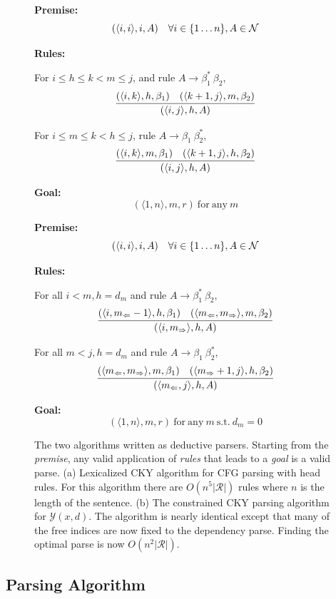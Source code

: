 \documentclass[11pt,letterpaper]{article}
\newcommand{\rules}{\mathcal{R}}
\newcommand{\Left}[1]{#1_{\Leftarrow}}
\newcommand{\Right}[1]{#1_{\Rightarrow}}
\newcommand{\Span}[1]{\langle #1 \rangle}
\newcommand{\tri}{\langle \Left{m}, \Right{m} \rangle}
\newcommand{\Root}{r}
\newcommand{\RuleA}[3]{#1 \rightarrow #2^*\ #3}
\newcommand{\RuleB}[3]{#1 \rightarrow #2\ #3^*}
\begin{document}
\begin{figure}
  \begin{multicols}{2}
  \noindent \textbf{Premise:}
  \[(\Span{i, i}, i, A)\ \ \ \forall i \in \{1 \ldots n\}, A \in {\cal N}\]

  \noindent\textbf{Rules:}

   For $i\leq h \leq k < m \leq j$,  and  rule  $\RuleA{A}{\beta_1}{\beta_2}$,
   \[\infer{( \Span{i, j},  h,  A)}{( \Span{i, k}, h, \beta_1)  &  ( \Span{k+1, j}, m, \beta_2) } \]

   For $i\leq m \leq k < h \leq j$, rule  $\RuleB{A}{\beta_1}{\beta_2}$,
   \[\infer{(\Span{i, j},  h, A)}{(\Span{i, k}, m, \beta_1)  &  (\Span{k+1, j}, h, \beta_2) }  \]

\noindent \textbf{Goal:}
\[ (\Span{1, n}, m, \Root) \mathrm{\ for\ any }\ m\]

\label{fig:cky}

  \noindent \textbf{Premise:}
  \[(\langle i,i \rangle, i, A)\ \ \ \forall i \in \{1 \ldots n\}, A \in {\cal N}\]

  \noindent\textbf{Rules:}

  For all   $i < m, h = d_m$  and rule  $\RuleA{A}{\beta_1}{\beta_2}$,
  \[\infer{( \Span{i, \Right{m}}, h, A)}{(\Span{i, \Left{m}-1}, h, \beta_1)  &  (\tri, m, \beta_2) } \]

  For all    $m < j, h = d_m$ and  rule  $\RuleB{A}{\beta_1}{\beta_2}$,
  \[ \infer{( \Span{ \Left{m}, j }, h, A)}{(\tri, m, \beta_1)  &  (\Span{\Right{m}+ 1, j}, h, \beta_2) } \]

\noindent \textbf{Goal:}
\[(\Span{1, n}, m, \Root) \mathrm{\ for\ any }\ m \mathrm{\ s.t. \ } d_m = 0 \]

\end{multicols}
\label{fig:cky_new}
\caption{The two algorithms written as deductive parsers. Starting from the \textit{premise}, any valid application of \textit{rules} that leads to a \textit{goal} is a valid parse.  (a) Lexicalized CKY algorithm for CFG parsing with head rules. For this algorithm there are $O(n^5|\rules|)$ rules where $n$ is the length of the sentence. (b) The constrained CKY parsing algorithm for $\mathcal{Y}(x, d)$. The algorithm is nearly identical except that many of the free indices are now fixed to the dependency parse. Finding the optimal parse is now $O(n^2|\rules|)$.}
\end{figure}

\subsection{Parsing Algorithm}
\end{document}
